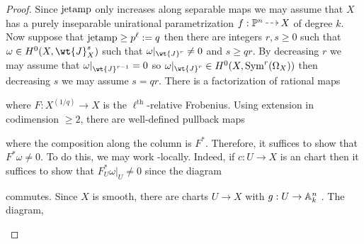 \documentclass[main.tex]{subfiles}
\begin{document}
\begin{proof}
Since $\mathrm{jetamp}$ only increases along separable maps we may assume that $X$ has a purely inseparable unirational parametrization $f : \P^n \rat X$ of degree $k$. Now suppose that $\mathrm{jetamp} \ge p^{\ell} := q$ then there are integers $r,s \ge 0$ such that $\omega \in H^0(X, \wt{J}_X^{s})$ such that $\omega|_{\wt{J}^{r}} \neq 0$ and $s \ge q r$. By decreasing $r$ we may assume that $\omega|_{\wt{J}^{r-1}} = 0$ so $\omega|_{\wt{J}^{r}} \in H^0(X, \nSym{r}{\Omega_X})$ then decreasing $s$ we may assume $s = q r$. There is a factorization of rational maps
\begin{center}
\end{center}
where $F : X^{(1/q)} \to X$ is the $\ell^{\text{th}}$-relative Frobenius.
Using extension in codimension $\ge 2$, there are well-defined pullback maps
\begin{center}
\end{center}
where the composition along the column is $F^*$. Therefore, it suffices to show that $F^* \omega \neq 0$. To do this, we may work \etale-locally. Indeed, if $c : U \to X$ is an \etale chart then it suffices to show that $F_U^* \omega|_U \neq 0$ since the diagram
\begin{center}
\end{center}
commutes. Since $X$ is smooth, there are \etale charts $U \to X$ with $g : U \to \mathbb{A}^n_k$ \etale. The diagram,
\begin{center}
\end{center}
\end{proof}
\end{document}
